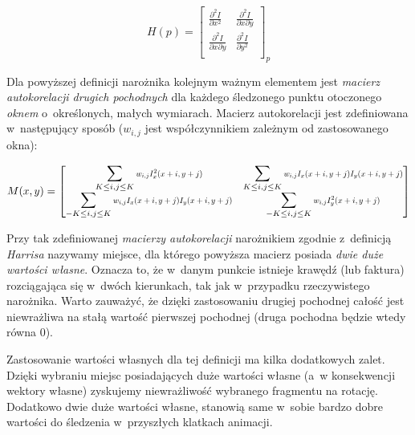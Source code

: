     \[
      H(p) =
        \begin{bmatrix}
          \frac{\partial^2 I}{\partial x^2} & \frac{\partial^2 I}{\partial x\partial y} \\
          \frac{\partial^2 I}{\partial x\partial y} & \frac{\partial^2 I}{\partial y^2} \\
        \end{bmatrix}_{p}
    \]

    \newpage
    Dla powyższej definicji narożnika kolejnym ważnym elementem jest \textit{macierz autokorelacji drugich pochodnych} dla każdego śledzonego punktu otoczonego \textit{oknem} o~określonych, małych wymiarach. Macierz autokorelacji jest zdefiniowana w~następujący sposób ($w_{i,j}$ jest współczynnikiem zależnym od zastosowanego okna):

    \[
      M(x, y) =
        \begin{bmatrix}
            \displaystyle\sum\limits_{K \le i, j \le K}
              \scalemath{0.75}{w_{i,j} I_{x}^{2} (x + i, y + j)} &
            \displaystyle\sum\limits_{K \le i, j \le K}
              \scalemath{0.75}{w_{i,j} I_{x} (x + i, y + j) I_{y} (x + i, y + j)} \\

            \displaystyle\sum\limits_{-K \le i, j \le K}
              \scalemath{0.75}{w_{i,j} I_{x} (x + i, y + j) I_{y} (x + i, y + j)} &
            \displaystyle\sum\limits_{-K \le i, j \le K}
              \scalemath{0.75}{w_{i,j} I_{y}^{2} (x + i, y + j)} \\
        \end{bmatrix}
    \]

    Przy tak zdefiniowanej \textit{macierzy autokorelacji} narożnikiem zgodnie z~definicją \textit{Harrisa} nazywamy miejsce, dla którego powyższa macierz posiada \textit{dwie duże wartości własne}. Oznacza to, że w~danym punkcie istnieje krawędź (lub faktura) rozciągająca się w~dwóch kierunkach, tak jak w~przypadku rzeczywistego narożnika. Warto zauważyć, że dzięki zastosowaniu drugiej pochodnej całość jest niewrażliwa na stałą wartość pierwszej pochodnej (druga pochodna będzie wtedy równa $0$).

    Zastosowanie wartości własnych dla tej definicji ma kilka dodatkowych zalet. Dzięki wybraniu miejsc posiadających duże wartości własne (a~w konsekwencji wektory własne) zyskujemy niewrażliwość wybranego fragmentu na rotację. Dodatkowo dwie duże wartości własne, stanowią same w~sobie bardzo dobre wartości do śledzenia w~przyszłych klatkach animacji.

